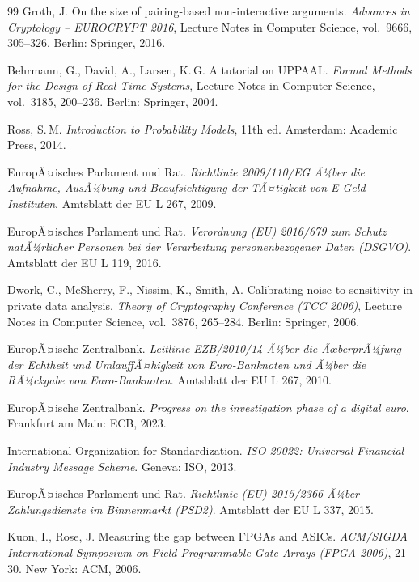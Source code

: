 ﻿\documentclass[a4paper,12pt]{article}
\theoremstyle{definition}
\begin{document}
\begin{thebibliography}{99}
  Groth, J.
  On the size of pairing-based non-interactive arguments.
  \emph{Advances in Cryptology -- EUROCRYPT 2016}, Lecture Notes in Computer
  Science, vol.\ 9666, 305--326. Berlin: Springer, 2016.

  Behrmann, G., David, A., Larsen, K.\,G.
  A tutorial on UPPAAL.
  \emph{Formal Methods for the Design of Real-Time Systems}, Lecture Notes in
  Computer Science, vol.\ 3185, 200--236. Berlin: Springer, 2004.

  Ross, S.\,M.
  \emph{Introduction to Probability Models}, 11th ed.
  Amsterdam: Academic Press, 2014.

  EuropÃ¤isches Parlament und Rat.
  \emph{Richtlinie 2009/110/EG Ã¼ber die Aufnahme, AusÃ¼bung und Beaufsichtigung
  der TÃ¤tigkeit von E-Geld-Instituten}.
  Amtsblatt der EU L 267, 2009.

  EuropÃ¤isches Parlament und Rat.
  \emph{Verordnung (EU) 2016/679 zum Schutz natÃ¼rlicher Personen bei der
  Verarbeitung personenbezogener Daten (DSGVO)}.
  Amtsblatt der EU L 119, 2016.

  Dwork, C., McSherry, F., Nissim, K., Smith, A.
  Calibrating noise to sensitivity in private data analysis.
  \emph{Theory of Cryptography Conference (TCC 2006)}, Lecture Notes in Computer
  Science, vol.\ 3876, 265--284. Berlin: Springer, 2006.

  EuropÃ¤ische Zentralbank.
  \emph{Leitlinie EZB/2010/14 Ã¼ber die ÃœberprÃ¼fung der Echtheit und UmlauffÃ¤higkeit
  von Euro-Banknoten und Ã¼ber die RÃ¼ckgabe von Euro-Banknoten}.
  Amtsblatt der EU L 267, 2010.

  EuropÃ¤ische Zentralbank.
  \emph{Progress on the investigation phase of a digital euro}.
  Frankfurt am Main: ECB, 2023.

  International Organization for Standardization.
  \emph{ISO 20022: Universal Financial Industry Message Scheme}.
  Geneva: ISO, 2013.

  EuropÃ¤isches Parlament und Rat.
  \emph{Richtlinie (EU) 2015/2366 Ã¼ber Zahlungsdienste im Binnenmarkt (PSD2)}.
  Amtsblatt der EU L 337, 2015.

  Kuon, I., Rose, J.
  Measuring the gap between FPGAs and ASICs.
  \emph{ACM/SIGDA International Symposium on Field Programmable Gate Arrays
  (FPGA 2006)}, 21--30. New York: ACM, 2006.


\end{thebibliography}
\end{document}
